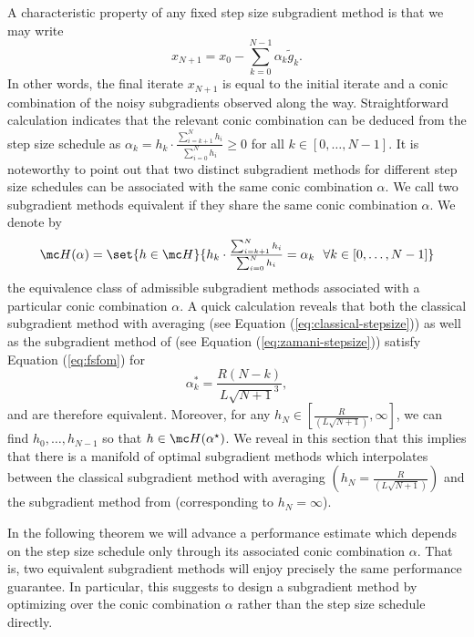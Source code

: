 \documentclass{article}
\begin{document}
A characteristic property of any fixed step size subgradient method is that we may write
\begin{equation}
  \label{eq:fsfom}
  x_{N+1} = x_0 - \textstyle \sum_{k=0}^{N-1} \alpha_{k} \tilde g_k.
\end{equation}
In other words, the final iterate $x_{N+1}$ is equal to the initial iterate and a conic combination of the noisy subgradients observed along the way. 
Straightforward calculation indicates that the relevant conic combination can be deduced from the step size schedule as
\(
  \alpha_k = h_k \cdot \textstyle\tfrac{\sum_{i=k+1}^N h_i}{\sum_{i=0}^N h_i} \geq 0
\)
for all $k\in [0, \dots, N-1]$. It is noteworthy to point out that two distinct subgradient methods for different step size schedules can be associated with the same conic combination $\alpha$. We call two subgradient methods equivalent if they share the same conic combination $\alpha$.  We denote by $$\mc H(\alpha) = \set{h\in \mc H}{h_k \cdot \textstyle\tfrac{\sum_{i=k+1}^N h_i}{\sum_{i=0}^N h_i}=\alpha_k ~~\forall k\in [0, \dots, N-1]}$$ the equivalence class of admissible subgradient methods associated with a particular conic combination $\alpha$.
%
A quick calculation reveals that both the classical subgradient method with averaging (see Equation (\ref{eq:classical-stepsize})) as well as the subgradient method of \cite{zamani2023exact} (see Equation (\ref{eq:zamani-stepsize})) satisfy Equation (\ref{eq:fsfom}) for 
\begin{equation}\label{eq:alpha-noiseless}
\alpha_k^* = \frac{R(N-k)}{L\sqrt{N+1}^3},    
\end{equation}
and are therefore equivalent.
Moreover, for any $h_N\in [\tfrac{R}{(L\sqrt{N+1})},\infty]$, we can find $h_0,\dots,h_{N-1}$ so that $h\in \mc H(\alpha^\star)$. We reveal in this section that this implies that there is a manifold of optimal subgradient methods which interpolates between the classical subgradient method with averaging $(h_N=\tfrac{R}{(L\sqrt{N+1})})$ and the subgradient method from \cite{zamani2023exact} (corresponding to $h_N=\infty$).

In the following theorem we will advance a performance estimate which depends on the step size schedule only through its associated conic combination $\alpha$.
That is, two equivalent subgradient methods will enjoy precisely the same performance guarantee. 
In particular, this suggests to design a subgradient method by optimizing over the conic combination $\alpha$ rather than the step size schedule directly.
\end{document}
